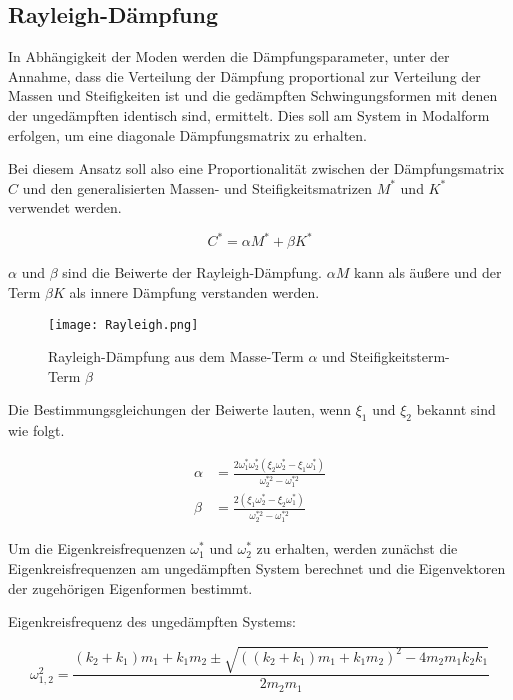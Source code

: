 \subsection{Rayleigh-Dämpfung}
\label{sec:rayleigh}

In Abhängigkeit der Moden werden die Dämpfungsparameter, unter der Annahme, dass die Verteilung der Dämpfung proportional zur Verteilung der Massen und Steifigkeiten ist und die gedämpften Schwingungsformen mit denen der ungedämpften identisch sind, ermittelt. Dies soll am System in Modalform erfolgen, um eine diagonale Dämpfungsmatrix zu erhalten. \cite{Dinkler2016}

Bei diesem Ansatz soll also eine Proportionalität zwischen der Dämpfungsmatrix $C$ und den generalisierten Massen- und Steifigkeitsmatrizen $M^*$ und $K^*$ verwendet werden.

\begin{equation*}
C^* = \alpha M^* + \beta K^*
\end{equation*}

$\alpha$ und $\beta$ sind die Beiwerte der Rayleigh-Dämpfung.
$\alpha M$ kann als äußere und der Term $\beta K$ als innere Dämpfung verstanden werden.

\begin{figure}[H]
    \centering
    \texttt{[image: Rayleigh.png]}
    \caption{Rayleigh-Dämpfung aus dem Masse-Term $\alpha$ und Steifigkeitsterm-Term $\beta$}
    \label{fig:rayleigh}
\end{figure}

Die Bestimmungsgleichungen der Beiwerte lauten, wenn $\xi_1$ und $\xi_2$ bekannt sind wie folgt. \cite{Shambhu}

\begin{align*}
\alpha &= \frac{2 \omega_1^* \omega_2^* (\xi_2 \omega_2^* - \xi_1 \omega_1^*)}{\omega_2^{*2} - \omega_1^{*2}}\\
\beta  &= \frac{2 (\xi_1 \omega_2^* - \xi_2 \omega_1^*)}{\omega_2^{*2} - \omega_1^{*2}}
\end{align*}

Um die Eigenkreisfrequenzen $\omega_1^*$ und $\omega_2^*$ zu erhalten, werden zunächst die Eigenkreisfrequenzen am ungedämpften System berechnet und die Eigenvektoren der zugehörigen Eigenformen bestimmt.

Eigenkreisfrequenz des ungedämpften Systems:

\begin{equation*}
\omega_{1,2}^2 = \frac{(k_2 + k_1) m_1 + k_1 m_2 \pm \sqrt{((k_2 + k_1) m_1 + k_1 m_2)^2 - 4 m_2 m_1 k_2 k_1}}{2 m_2 m_1}
\end{equation*}

